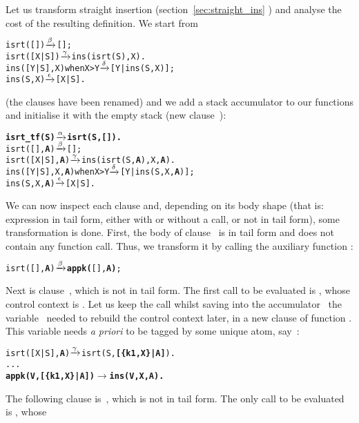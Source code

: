 Let us transform straight insertion (section~\ref{sec:straight_ins}
) and analyse the cost of the resulting
definition. We start from
\begin{alltt}
isrt(   [])             \(\smashedrightarrow{\beta}\) [];
isrt([X|S])             \(\smashedrightarrow{\gamma}\) ins(isrt(S),X).
ins([Y|S],X) when X > Y \(\smashedrightarrow{\delta}\) [Y|ins(S,X)];
ins(    S,X)            \(\smashedrightarrow{\epsilon}\) [X|S].
\end{alltt}
(the clauses have been renamed) and we add a stack accumulator to our
functions and initialise it with the empty stack (new
clause~\clause{\alpha}):
\begin{alltt}
\textbf{isrt\_tf(S)                \(\smashedrightarrow{\alpha}\) isrt(S,[]).}
isrt(   [],\textbf{A})             \(\smashedrightarrow{\beta}\) [];\hfill% A \emph{unused yet}
isrt([X|S],\textbf{A})             \(\smashedrightarrow{\gamma}\) ins(isrt(S,\textbf{A}),X,\textbf{A}).
ins([Y|S],X,\textbf{A}) when X > Y \(\smashedrightarrow{\delta}\) [Y|ins(S,X,\textbf{A})];
ins(    S,X,\textbf{A})            \(\smashedrightarrow{\epsilon}\) [X|S].\hfill% A \emph{unused yet}
\end{alltt}
We can now inspect each clause and, depending on its body shape (that
is: expression in tail form, either with or without a call, or not in
tail form), some transformation is done. First, the body of
clause~\clause{\beta} is in tail form and does not contain any
function call. Thus, we transform it by calling the auxiliary
function :
\begin{alltt}
isrt(   [],\textbf{A})             \(\smashedrightarrow{\beta}\) \textbf{appk(}[],\textbf{A)};
\end{alltt}
Next is clause~\clause{\gamma}, which is not in tail form. The first
call to be evaluated is , whose control context is
. Let us keep the call whilst
saving into the accumulator~ the variable~
needed to rebuild the control context later, in a new clause of
function . This variable needs \emph{a priori} to be
tagged by some unique atom, say~:
\begin{alltt}
isrt([X|S],\textbf{A})             \(\smashedrightarrow{\gamma}\) isrt(S,\textbf{[\{k1,X\}|A]}).
...
\textbf{appk(V,[\{k1,X\}|A])        \(\rightarrow\) ins(V,X,A).}
\end{alltt}
The following clause is~\clause{\delta}, which is not in tail
form. The only call to be evaluated is , whose
